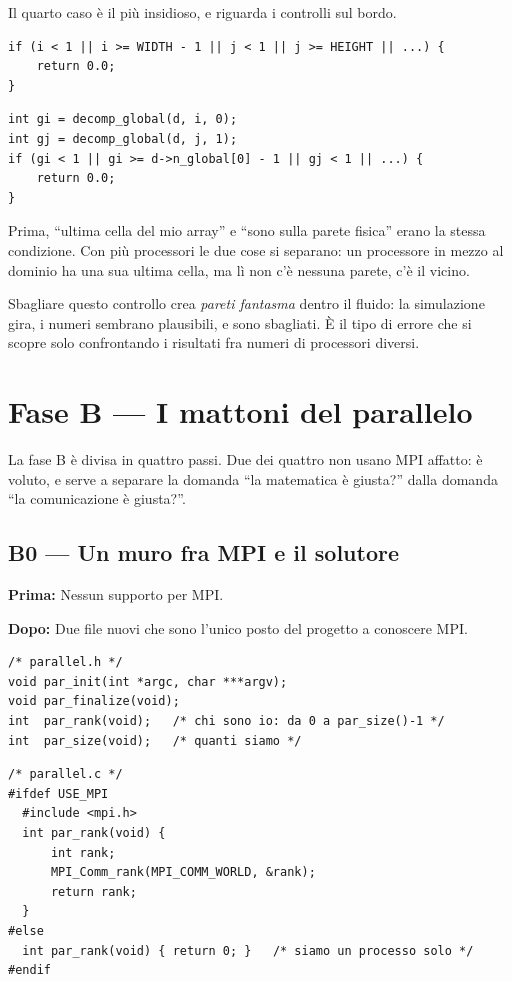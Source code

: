 \documentclass[11pt,a4paper]{article}
\newcommand{\prima}[1]{\par\smallskip\noindent\textbf{\color{scuro}Prima:} #1\par}
\newcommand{\dopo}[1]{\par\smallskip\noindent\textbf{\color{scuro}Dopo:} #1\par\smallskip}
\newcommand{\etichetta}[1]{\par\smallskip\noindent{\small\bfseries\color{scuro}#1}\par\vspace{-4pt}}
\begin{document}
Il quarto caso è il più insidioso, e riguarda i controlli sul bordo.

\etichetta{Prima}
\begin{lstlisting}
if (i < 1 || i >= WIDTH - 1 || j < 1 || j >= HEIGHT || ...) {
    return 0.0;
}
\end{lstlisting}

\etichetta{Dopo}
\begin{lstlisting}
int gi = decomp_global(d, i, 0);
int gj = decomp_global(d, j, 1);
if (gi < 1 || gi >= d->n_global[0] - 1 || gj < 1 || ...) {
    return 0.0;
}
\end{lstlisting}

Prima, ``ultima cella del mio array'' e ``sono sulla parete fisica'' erano la
stessa condizione. Con più processori le due cose si separano: un processore in
mezzo al dominio ha una sua ultima cella, ma lì non c'è nessuna parete, c'è il
vicino.

Sbagliare questo controllo crea \emph{pareti fantasma} dentro il fluido: la
simulazione gira, i numeri sembrano plausibili, e sono sbagliati. È il tipo di
errore che si scopre solo confrontando i risultati fra numeri di processori
diversi.

\section{Fase B --- I mattoni del parallelo}

La fase B è divisa in quattro passi. Due dei quattro non usano MPI affatto:
è voluto, e serve a separare la domanda ``la matematica è giusta?'' dalla
domanda ``la comunicazione è giusta?''.

\subsection*{B0 --- Un muro fra MPI e il solutore}

\prima{Nessun supporto per MPI.}
\dopo{Due file nuovi che sono l'unico posto del progetto a conoscere MPI.}

\begin{lstlisting}
/* parallel.h */
void par_init(int *argc, char ***argv);
void par_finalize(void);
int  par_rank(void);   /* chi sono io: da 0 a par_size()-1 */
int  par_size(void);   /* quanti siamo */
\end{lstlisting}

\begin{lstlisting}
/* parallel.c */
#ifdef USE_MPI
  #include <mpi.h>
  int par_rank(void) {
      int rank;
      MPI_Comm_rank(MPI_COMM_WORLD, &rank);
      return rank;
  }
#else
  int par_rank(void) { return 0; }   /* siamo un processo solo */
#endif
\end{lstlisting}
\end{document}
